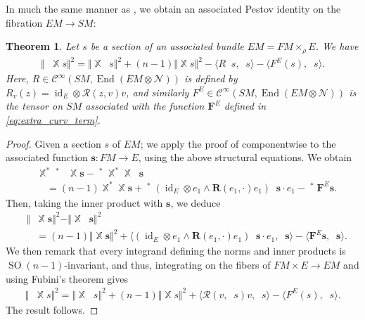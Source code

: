 \documentclass[12pt]{amsart}
\numberwithin{numbering}{section}
\theoremstyle{plain}
\newtheorem{thm}[numbering]{Theorem}
\theoremstyle{definition}
\theoremstyle{remark}
\numberwithin{equation}{section}
\DeclareMathOperator{\identity}{id}
\DeclareMathOperator{\End}{End}
\DeclareMathOperator{\SO}{SO}
\DeclareMathOperator{\nv}{\nabla_{\mathbb{V}}}
\DeclareMathOperator{\xx}{\mathbb{X}}
\newcommand{\rfm}{\mathbf{R}}
\begin{document}
In much the same manner as \cite[Corollary 3.6]{cekic2025pestov}, we obtain an associated Pestov identity on the fibration $EM \to SM$:
\begin{thm} \label{thm:tensor_pestov}
Let $s$ be a section of an associated bundle $EM = FM \times_\rho E$. We have 
\begin{align}
\Vert \nv \xx s \Vert^2 = \Vert \xx \nv s \Vert^2 + (n-1) \Vert \xx s \Vert^2 - \langle R \nv s, \nv s \rangle - \langle F^E(s), \nv s \rangle.
\end{align}
Here, $R \in \mathcal{C}^\infty(SM, \End(EM \otimes \mathcal{N}))$ is defined by $R_v(z) = \identity_E \otimes \mathcal{R}(z, v) v$, and similarly $F^E \in \mathcal{C}^\infty(SM, \End(EM \otimes \mathcal{N}))$ is the tensor on $SM$ associated with the function $\mathbf{F}^E$ defined in \eqref{eq:extra_curv_term}.
\end{thm}
\begin{proof}
Given a section $s$ of $EM$; we apply the proof of \cite[Theorem 3.1]{cekic2025pestov} componentwise to the associated function $\mathbf{s}: FM \to E$, using the above structural equations. We obtain 
\begin{align*}
&\xx^* \nv^* \nv \xx \mathbf{s} - \nv^* \xx^* \xx \nv \mathbf{s} \\
&\quad = (n-1) \xx^* \xx \mathbf{s} + \nv^* (\identity_E \otimes e_1 \wedge \rfm(e_1, \cdot) e_1) \nv \mathbf{s} \cdot e_1 - \nv^* \mathbf{F}^E \mathbf{s}.
\end{align*}
Then, taking the inner product with $\mathbf{s}$, we deduce 
\begin{align*}
&\Vert \nv \xx \mathbf{s} \Vert^2 - \Vert \xx \nv \mathbf{s} \Vert^2 \\
&\quad = (n-1) \Vert \xx \mathbf{s} \Vert^2 + \langle (\identity_E \otimes e_1 \wedge \rfm(e_1, \cdot) e_1) \nv \mathbf{s} \cdot e_1, \nv \mathbf{s} \rangle - \langle \mathbf{F}^E \mathbf{s}, \nv \mathbf{s} \rangle.
\end{align*}
We then remark that every integrand defining the norms and inner products is $\SO(n-1)$-invariant, and thus, integrating on the fibers of $FM \times E \to EM$ and using Fubini's theorem gives 
\begin{align}
\Vert \nv \xx s \Vert^2 = \Vert \xx \nv s \Vert^2 + (n-1) \Vert \xx s \Vert^2 + \langle \mathcal{R}(v, \nv s)v, \nv s \rangle - \langle F^E(s), \nv s \rangle.
\end{align}
The result follows.
\end{proof}
\end{document}
